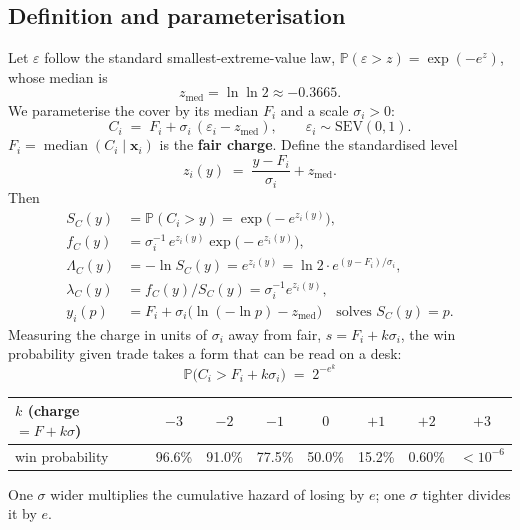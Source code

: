 \documentclass[11pt,a4paper]{article}
\theoremstyle{definition}
\theoremstyle{remark}
\newcommand{\Prob}{\mathbb{P}}
\newcommand{\zm}{z_{\mathrm{med}}}
\newcommand{\bx}{\bm{x}}
\begin{document}
\subsection{Definition and parameterisation}\label{sec:definition}
Let $\varepsilon$ follow the standard smallest-extreme-value law, $\Prob(\varepsilon>z)=\exp(-e^{z})$, whose median is
\[
\zm=\ln\ln 2\approx -0.3665 .
\]
We parameterise the cover by its median $F_i$ and a scale $\sigma_i>0$:
\begin{equation}\label{eq:cover}
C_i \;=\; F_i + \sigma_i\,(\varepsilon_i - \zm),\qquad \varepsilon_i\sim\mathrm{SEV}(0,1).
\end{equation}
$F_i=\operatorname{median}(C_i\mid\bx_i)$ is the \textbf{fair charge}. Define the standardised level
\begin{equation}\label{eq:z}
z_i(y) \;=\; \frac{y-F_i}{\sigma_i}+\zm .
\end{equation}
Then
\begin{align}
S_{C}(y) &= \Prob(C_i>y) = \exp\!\bigl(-e^{z_i(y)}\bigr), \label{eq:S}\\
f_{C}(y) &= \sigma_i^{-1}\,e^{z_i(y)}\exp\!\bigl(-e^{z_i(y)}\bigr), \label{eq:f}\\
\Lambda_C(y) &= -\ln S_C(y)=e^{z_i(y)}=\ln 2\cdot e^{(y-F_i)/\sigma_i}, \label{eq:cumhaz}\\
\lambda_C(y) &= f_C(y)/S_C(y)=\sigma_i^{-1}e^{z_i(y)}, \label{eq:hazard}\\
y_i(p) &= F_i+\sigma_i\bigl(\ln(-\ln p)-\zm\bigr)\quad\text{solves } S_C(y)=p. \label{eq:quantile}
\end{align}
Measuring the charge in units of $\sigma_i$ away from fair, $s=F_i+k\sigma_i$, the win probability given trade takes a form that can be read on a desk:
\begin{equation}\label{eq:twopower}
\boxed{\;\Prob\bigl(C_i>F_i+k\sigma_i\bigr)\;=\;2^{-e^{k}}\;}
\end{equation}
\begin{center}
\begin{tabular}{lccccccc}
\toprule
$k$ (charge $=F+k\sigma$) & $-3$ & $-2$ & $-1$ & $0$ & $+1$ & $+2$ & $+3$ \\
\midrule
win probability & 96.6\% & 91.0\% & 77.5\% & 50.0\% & 15.2\% & 0.60\% & $<10^{-6}$ \\
\bottomrule
\end{tabular}
\end{center}
One $\sigma$ wider multiplies the cumulative hazard of losing by $e$; one $\sigma$ tighter divides it by $e$.
\end{document}

